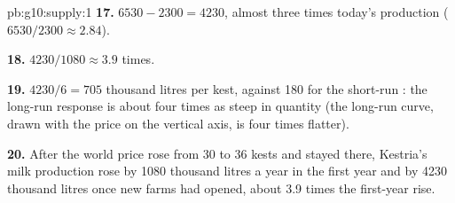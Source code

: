 \begin{solution}{pb:g10:supply:1}
\textbf{17.} $6530 - 2300 = 4230$, almost three times today's production ($6530/2300 \approx 2.84$).

\textbf{18.} $4230/1080 \approx 3.9$ times.

\textbf{19.} $4230/6 = 705$ thousand litres per kest, against 180 for the short-run : the long-run response is about four times as steep in
quantity (the long-run curve, drawn with the price on the vertical axis, is four times flatter).

\textbf{20.} After the world price rose from 30 to 36 kests and stayed there, Kestria's milk production rose by \num{1080} thousand litres a year in the
first year and by \num{4230} thousand litres once new farms had opened, about 3.9 times the first-year rise.
\end{solution}
